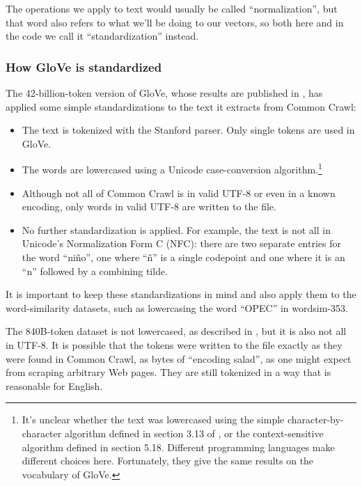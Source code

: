 \documentclass[letterpaper]{article}
\begin{document}
The operations we apply to text would usually be called ``normalization'',
but that word also refers to what we'll be doing to our vectors, so both
here and in the code we call it ``standardization'' instead.

\subsubsection{How GloVe is standardized}

The 42-billion-token version of GloVe, whose results are published in
\cite{pennington2014glove}, has applied some simple standardizations
to the text it extracts from Common Crawl:

\begin{itemize}
\item The text is tokenized with the Stanford parser. Only single tokens are
    used in GloVe.
\item The words are lowercased using a Unicode case-conversion
    algorithm.\footnote{
        It's unclear whether the text was lowercased using the simple
        character-by-character algorithm defined in section 3.13 of
        \cite{unicode2014}, or the context-sensitive algorithm defined in section
        5.18. Different programming languages make different choices here.
        Fortunately, they give the same results on the vocabulary of GloVe.
}
\item Although not all of Common Crawl is in valid UTF-8 or even in a known
    encoding, only words in valid UTF-8 are written to the file.
\item No further standardization is applied. For example, the text is not all
    in Unicode's Normalization Form C (NFC): there are two separate entries
    for the word ``ni\~{n}o'', one where ``\~{n}'' is a single codepoint and
    one where it is an ``n'' followed by a combining tilde.
\end{itemize}

It is important to keep these standardizations in mind and also apply them to
the word-similarity datasets, such as lowercasing the word ``OPEC'' in {\sc
wordsim-353}.

The 840B-token dataset is not lowercased, as described in
\cite{pennington2014glove}, but it is also not all in UTF-8. It is possible
that the tokens were written to the file exactly as they were found in
Common Crawl, as bytes of ``encoding salad'', as one might expect from
scraping arbitrary Web pages. They are still tokenized in a way that is
reasonable for English.
\end{document}
